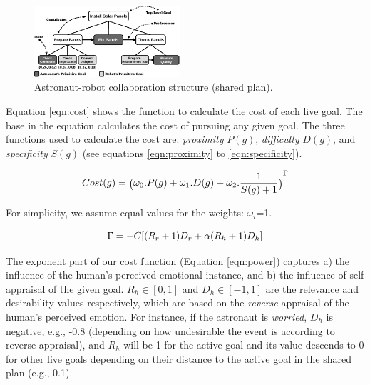 \documentclass[conference]{IEEEtran}
\begin{document}
\begin{figure}[tbh]
  \centering
  \vspace*{-1mm}
  \includegraphics[width=0.48\textwidth]{figure/collaborationStructure-croped.pdf}
  \vspace*{-3mm}
  \caption{{\fontsize{9}{9}\selectfont Astronaut-robot collaboration structure
  (shared plan).}}
  \label{fig:taskModel}
  \vspace*{-3mm}
\end{figure}

Equation \ref{eqn:cost} shows the function to calculate the cost of each
live goal. The base in the equation calculates the cost of pursuing any given
goal. The three functions used to calculate the cost are:
\textit{proximity} $P(g)$, \textit{difficulty} $D(g)$, and \textit{specificity}
$S(g)$ (see equations \ref{eqn:proximity} to \ref{eqn:specificity}).

\vspace*{-7mm}
\begin{equation}
{\fontsize{6}{9}\selectfont Cost(g) =
\big(\omega_0.P(g)+\omega_1.D(g)+\omega_2.\frac{1}{S(g)+1}\big)}^{\Gamma}
\label{eqn:cost}
\vspace*{-1mm}
\end{equation}

\noindent For simplicity, we assume equal values for the weights: $\omega_i$=1.

\vspace*{-2mm}
\begin{equation}
\Gamma=-C[(R_r+1)D_r + \alpha(R_h+1)D_h]
\label{eqn:power}
\vspace*{-2mm}
\end{equation}

The exponent part of our cost function (Equation \ref{eqn:power}) captures a)
the influence of the human's perceived emotional instance, and b) the influence
of self appraisal of the given goal. $R_h\in[0,1]$ and $D_h\in[-1,1]$ are the
relevance and desirability values respectively, which are based on the
\textit{reverse} appraisal of the human's perceived emotion. For instance, if
the astronaut is \textit{worried}, $D_h$ is negative, e.g., -0.8 (depending on
how undesirable the event is according to reverse appraisal), and $R_h$ will be
1 for the active goal and its value descends to 0 for other live goals depending
on their distance to the active goal in the shared plan (e.g., 0.1).
\end{document}
